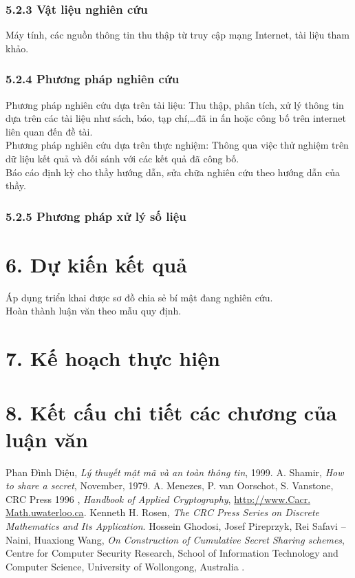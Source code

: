 \documentclass[12pt,a4paper]{report}
\begin{document}
		\subsubsection*{5.2.3 Vật liệu nghiên cứu }
	Máy tính, các nguồn thông tin thu thập từ truy cập mạng Internet, tài liệu tham khảo.
		\subsubsection*{5.2.4 Phương pháp nghiên cứu}
	Phương pháp nghiên cứu dựa trên tài liệu: Thu thập, phân tích, xử lý thông tin dựa trên các tài liệu như sách, báo, tạp chí,…đã in ấn hoặc công bố trên internet liên quan đến đề tài.
	\\Phương pháp nghiên cứu dựa trên thực nghiệm: Thông qua việc thử nghiệm trên dữ liệu kết quả và đối sánh với các kết quả đã công  bố.
	\\	Báo cáo định kỳ cho thầy hướng dẫn, sửa chữa nghiên cứu theo hướng dẫn của thầy.
		
		\subsubsection*{5.2.5 Phương pháp xử lý số liệu}
\section*{6. Dự kiến kết quả}
	 Áp dụng triển khai được sơ đồ chia sẻ bí mật đang nghiên cứu.
\\	 Hoàn thành luận văn theo mẫu quy định.
	
\section*{7. Kế hoạch thực hiện}
\section*{8. Kết cấu chi tiết các chương của luận văn}

\begin{thebibliography}{99}
	 Phan Đình Diệu, \textit{Lý thuyết mật mã và an toàn thông tin}, 1999.
	 A. Shamir, \textit{How to share a secret}, November, 1979.
	 A. Menezes, P. van Oorschot, S. Vanstone, CRC Press 1996 , \textit{Handbook of Applied Cryptography}, \url{http://www.Cacr. Math.uwaterloo.ca}.
	Kenneth H. Rosen, \textit{The CRC Press Series on Discrete Mathematics and Its Application}.
	Hossein Ghodosi, Josef Pireprzyk, Rei Safavi – Naini, Huaxiong Wang, \textit{On Construction of Cumulative Secret Sharing schemes}, Centre for Computer Security Research, School of Information Technology and Computer Science, University of Wollongong, Australia .
\end{thebibliography}

\end{document}
